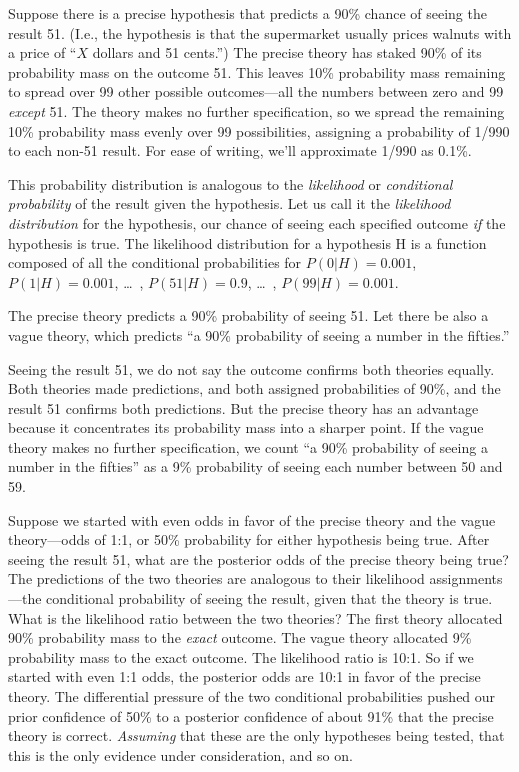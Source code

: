 {
 Suppose there is a precise hypothesis that predicts a 90\% chance
of seeing the result 51. (I.e., the hypothesis is that the supermarket
usually prices walnuts with a price of ``$X$ dollars and
51 cents.'') The precise theory has staked 90\% of
its probability mass on the outcome 51. This leaves 10\% probability
mass remaining to spread over 99 other possible outcomes---all the
numbers between zero and 99 \textit{except} 51. The theory makes no
further specification, so we spread the remaining 10\% probability mass
evenly over 99 possibilities, assigning a probability of 1/990 to each
non-51 result. For ease of writing, we'll approximate
1/990 as 0.1\%.}

{
 This probability distribution is analogous to the
\textit{likelihood} or \textit{conditional probability} of the result
given the hypothesis. Let us call it the \textit{likelihood
distribution} for the hypothesis, our chance of seeing each specified
outcome \textit{if} the hypothesis is true. The likelihood distribution
for a hypothesis H is a function composed of all the conditional
probabilities for $P(0|H) = 0.001$, $P(1|H) = 0.001$,
\ldots~, $P(51|H) = 0.9$, \ldots~, $P(99|H) = 0.001$.}

{
 The precise theory predicts a 90\% probability of seeing 51. Let
there be also a vague theory, which predicts ``a 90\%
probability of seeing a number in the fifties.''}

{
 Seeing the result 51, we do not say the outcome confirms both
theories equally. Both theories made predictions, and both assigned
probabilities of 90\%, and the result 51 confirms both predictions. But
the precise theory has an advantage because it concentrates its
probability mass into a sharper point. If the vague theory makes no
further specification, we count ``a 90\% probability
of seeing a number in the fifties'' as a 9\%
probability of seeing each number between 50 and 59.}

{
 Suppose we started with even odds in favor of the precise theory
and the vague theory---odds of 1:1, or 50\% probability for either
hypothesis being true. After seeing the result 51, what are the
posterior odds of the precise theory being true? The predictions of the
two theories are analogous to their likelihood assignments---the
conditional probability of seeing the result, given that the theory is
true. What is the likelihood ratio between the two theories? The first
theory allocated 90\% probability mass to the \textit{exact} outcome.
The vague theory allocated 9\% probability mass to the exact outcome.
The likelihood ratio is 10:1. So if we started with even 1:1 odds, the
posterior odds are 10:1 in favor of the precise theory. The
differential pressure of the two conditional probabilities pushed our
prior confidence of 50\% to a posterior confidence of about 91\% that
the precise theory is correct. \textit{Assuming} that these are the
only hypotheses being tested, that this is the only evidence under
consideration, and so on.}

